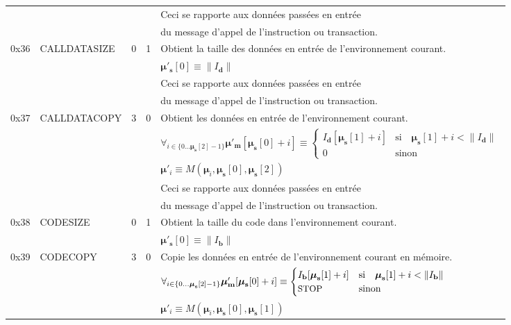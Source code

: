 \documentclass[9pt,oneside]{amsart}
\begin{document}
\begin{tabular*}{\columnwidth}[h]{rlrrl}
&&&& Ceci se rapporte aux données passées en entrée \\
&&&& du message d'appel de l'instruction ou transaction. \\
\midrule
0x36 & {\small CALLDATASIZE} & 0 & 1 & Obtient la taille des données en entrée de l'environnement courant. \\
&&&& $\boldsymbol{\mu}'_\mathbf{s}[0] \equiv \lVert I_\mathbf{d} \rVert$ \\
&&&& Ceci se rapporte aux données passées en entrée \\
&&&& du message d'appel de l'instruction ou transaction. \\
\midrule
0x37 & {\small CALLDATACOPY} & 3 & 0 & Obtient les données en entrée de l'environnement courant. \\
&&&& $\forall_{i \in \{ 0 \dots \boldsymbol{\mu}_\mathbf{s}[2] - 1\} } \boldsymbol{\mu}'_\mathbf{m}[\boldsymbol{\mu}_\mathbf{s}[0] + i ] \equiv
\begin{cases} I_\mathbf{d}[\boldsymbol{\mu}_\mathbf{s}[1] + i] & \text{si} \quad \boldsymbol{\mu}_\mathbf{s}[1] + i < \lVert I_\mathbf{d} \rVert \\ 0 & \text{sinon} \end{cases}$\\
&&&& $\boldsymbol{\mu}'_i \equiv M(\boldsymbol{\mu}_i, \boldsymbol{\mu}_\mathbf{s}[0], \boldsymbol{\mu}_\mathbf{s}[2])$ \\
&&&& Ceci se rapporte aux données passées en entrée \\
&&&& du message d'appel de l'instruction ou transaction. \\
\midrule
0x38 & {\small CODESIZE} & 0 & 1 & Obtient la taille du code dans l'environnement courant. \\
&&&& $\boldsymbol{\mu}'_\mathbf{s}[0] \equiv \lVert I_\mathbf{b} \rVert$ \\
\midrule
0x39 & {\small CODECOPY} & 3 & 0 & Copie les données en entrée de l'environnement courant en mémoire. \\
&&&& $\forall_{i \in \{ 0 \dots \boldsymbol{\mu}_\mathbf{s}[2] - 1\} } \boldsymbol{\mu}'_\mathbf{m}[\boldsymbol{\mu}_\mathbf{s}[0] + i ] \equiv
\begin{cases} I_\mathbf{b}[\boldsymbol{\mu}_\mathbf{s}[1] + i] & \text{si} \quad \boldsymbol{\mu}_\mathbf{s}[1] + i < \lVert I_\mathbf{b} \rVert \\ \text{\small STOP} & \text{sinon} \end{cases}$\\
&&&& $\boldsymbol{\mu}'_i \equiv M(\boldsymbol{\mu}_i, \boldsymbol{\mu}_\mathbf{s}[0], \boldsymbol{\mu}_\mathbf{s}[1])$ \\

\end{tabular*}
\end{document}
